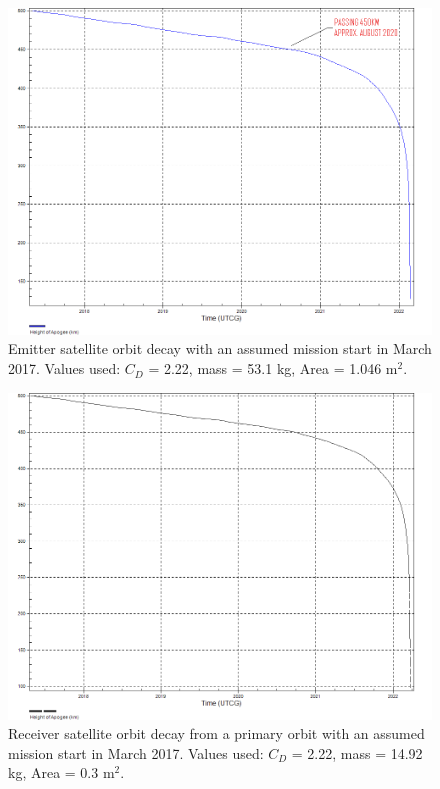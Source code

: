 \begin{landscape}
\begin{figure}[ht!]
\centering
\includegraphics[width = \textheight]{chapters/img/emitterDecay.png}
\caption{Emitter satellite orbit decay with an assumed mission start in March 2017. Values used: $C_D$ = 2.22, mass = 53.1 kg, Area = 1.046 m$^2$.}
\label{fig:emLife}
\end{figure}

\begin{figure}[ht!]
\centering
\includegraphics[width = \textheight]{chapters/img/receiverDecay.png}
\caption{Receiver satellite orbit decay from a primary orbit with an assumed mission start in March 2017. Values used: $C_D$ = 2.22, mass = 14.92 kg, Area = 0.3 m$^2$.}
\label{fig:recLife}
\end{figure}


\end{landscape}
